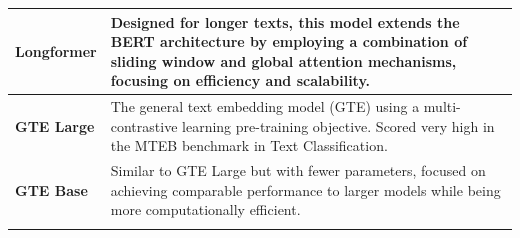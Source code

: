 \documentclass{article}
\theoremstyle{plain}
\theoremstyle{definition}
\theoremstyle{remark}
\begin{document}
\begin{table}[H]
\begin{tabular}{p{6cm}p{8cm}}
\midrule
\textbf{Longformer} \cite{beltagy2020longformer} & Designed for longer texts, this model extends the BERT architecture by employing a combination of sliding window and global attention mechanisms, focusing on efficiency and scalability.\\
\midrule
\textbf{GTE Large} \cite{li2023towards} & The general text embedding model (GTE) using a multi-contrastive learning pre-training objective. Scored very high in the MTEB benchmark in Text Classification.\\
\midrule
\textbf{GTE Base} & Similar to GTE Large but with fewer parameters, focused on achieving comparable performance to larger models while being more computationally efficient.\\
\bottomrule
\label{TableModel}
\end{tabular}
\end{table}
\end{document}
